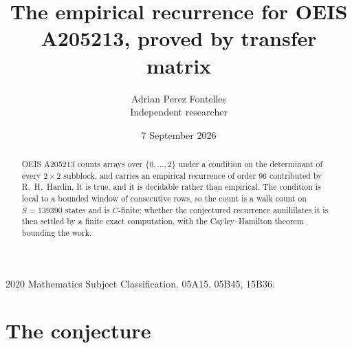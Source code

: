 \documentclass[11pt,a4paper]{article}
\title{The empirical recurrence for OEIS A205213, proved by transfer matrix}
\author{Adrian Perez Fontelles\\ \small Independent researcher}
\date{7 September 2026}
\theoremstyle{plain}
\theoremstyle{definition}
\begin{document}
\maketitle

\begin{abstract}
OEIS A205213 counts arrays over $\{0,\dots,2\}$ under a condition on the determinant of every
$2\times2$ subblock, and carries an empirical recurrence of order $96$ contributed by
R.~H.~Hardin. It is true, and it is decidable rather than empirical. The condition is local to
a bounded window of consecutive rows, so the count is a walk count on $S=139390$ states and is
$C$-finite; whether the conjectured recurrence annihilates it is then settled by a finite exact
computation, with the Cayley--Hamilton theorem bounding the work.
\end{abstract}

\noindent\small 2020 Mathematics Subject Classification. 05A15, 05B45, 15B36.\normalsize

\section{The conjecture}
\end{document}
